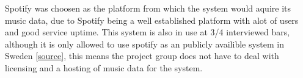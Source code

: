 Spotify was choosen as the platform from which the system would aquire its music data, due to Spotify being a well established platform with alot of users and good service uptime. This system is also in use at 3/4 interviewed bars, although it is only allowed to use spotify as an publicly availible system in Sweden \cref{source}, this means the project group does not have to deal with licensing and a hosting of music data for the system.